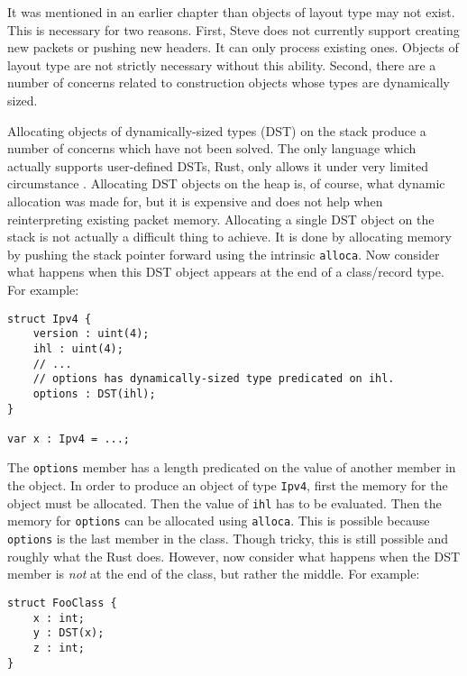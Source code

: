 It was mentioned in an earlier chapter than objects of layout type may not exist.
This is necessary for two reasons.
First, Steve does not currently support creating new packets or pushing new headers.
It can only process existing ones.
Objects of layout type are not strictly necessary without this ability.
Second, there are a number of concerns related to construction objects whose
types are dynamically sized.

Allocating objects of dynamically-sized types (DST) on the stack produce a number of concerns which have not been solved.
The only language which actually supports user-defined DSTs, Rust, only allows it under
very limited circumstance \cite{rust_dst_std}.
Allocating DST objects on the heap is, of course, what dynamic allocation was made for, but
it is expensive and does not help when reinterpreting existing packet memory.
Allocating a single DST object on the stack is not actually a difficult thing to achieve.
It is done by allocating memory by pushing the stack pointer forward using the intrinsic
\texttt{alloca}.
Now consider what happens when this DST object appears at the end of a class/record
type. For example:

\begin{codepage}
\begin{lstlisting}
struct Ipv4 {
	version : uint(4);
	ihl : uint(4);
	// ...
	// options has dynamically-sized type predicated on ihl.
	options : DST(ihl);
}

var x : Ipv4 = ...;
\end{lstlisting}
\end{codepage}

The \texttt{options} member has a length predicated on the value
of another member in the object. In order to produce an object of type \texttt{Ipv4},
first the memory for the object must be allocated. Then the value of \texttt{ihl}
has to be evaluated. Then the memory for \texttt{options} can be allocated
using \texttt{alloca}. This is possible because \texttt{options} is the last member in the class. Though tricky, this is still possible and roughly what the Rust does.
However, now consider what happens when the DST member is \emph{not} at the end
of the class, but rather the middle. For example:

\begin{codepage}
\begin{lstlisting}
struct FooClass {
	x : int;
	y : DST(x);
	z : int;
}
\end{lstlisting}
\end{codepage}

